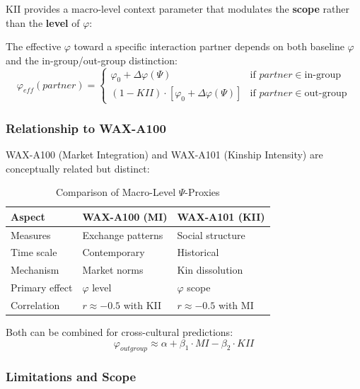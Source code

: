 KII provides a macro-level context parameter that modulates the \textbf{scope} rather than the \textbf{level} of $\varphi$:

\begin{definition}
\label{def:scope-phi}
The effective $\varphi$ toward a specific interaction partner depends on both baseline $\varphi$ and the in-group/out-group distinction:
\begin{equation}
\varphi_{eff}(partner) = \begin{cases}
\varphi_0 + \Delta\varphi(\Psi) & \text{if } partner \in \text{in-group} \\
(1 - KII) \cdot [\varphi_0 + \Delta\varphi(\Psi)] & \text{if } partner \in \text{out-group}
\end{cases}
\end{equation}
\end{definition}

\subsubsection{Relationship to WAX-A100}

WAX-A100 (Market Integration) and WAX-A101 (Kinship Intensity) are conceptually related but distinct:

\begin{table}[htbp]
\centering
\caption{Comparison of Macro-Level $\Psi$-Proxies}
\begin{tabular}{@{}lll@{}}
\toprule
\textbf{Aspect} & \textbf{WAX-A100 (MI)} & \textbf{WAX-A101 (KII)} \\
\midrule
Measures & Exchange patterns & Social structure \\
Time scale & Contemporary & Historical \\
Mechanism & Market norms & Kin dissolution \\
Primary effect & $\varphi$ level & $\varphi$ scope \\
Correlation & $r \approx -0.5$ with KII & $r \approx -0.5$ with MI \\
\bottomrule
\end{tabular}
\end{table}

Both can be combined for cross-cultural predictions:
\begin{equation}
\varphi_{outgroup} \approx \alpha + \beta_1 \cdot MI - \beta_2 \cdot KII
\end{equation}

\subsubsection{Limitations and Scope}

